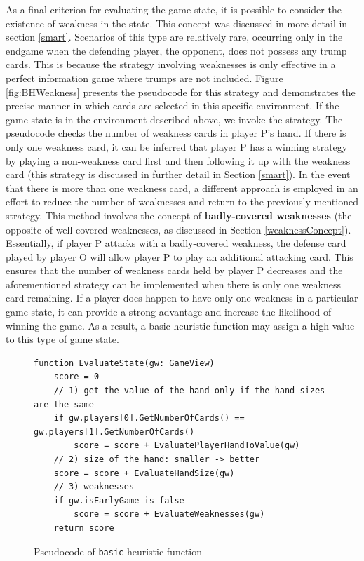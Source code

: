 As a final criterion for evaluating the game state, it is possible to consider the existence of weakness in the state. This concept was discussed in more detail in section \ref{smart}. Scenarios of this type are relatively rare, occurring only in the endgame when the defending player, the opponent, does not possess any trump cards. This is because the strategy involving weaknesses is only effective in a perfect information game where trumps are not included. Figure \ref{fig:BHWeakness} presents the pseudocode for this strategy and demonstrates the precise manner in which cards are selected in this specific environment. If the game state is in the environment described above, we invoke the strategy. The pseudocode checks the number of weakness cards in player P's hand. If there is only one weakness card, it can be inferred that player P has a winning strategy by playing a non-weakness card first and then following it up with the weakness card (this strategy is discussed in further detail in Section \ref{smart}). In the event that there is more than one weakness card, a different approach is employed in an effort to reduce the number of weaknesses and return to the previously mentioned strategy. This method involves the concept of \textbf{badly-covered weaknesses} (the opposite of well-covered weaknesses, as discussed in Section \ref{weaknessConcept}). Essentially, if player P attacks with a badly-covered weakness, the defense card played by player O will allow player P to play an additional attacking card. This ensures that the number of weakness cards held by player P decreases and the aforementioned strategy can be implemented when there is only one weakness card remaining. If a player does happen to have only one weakness in a particular game state, it can provide a strong advantage and increase the likelihood of winning the game. As a result, a basic heuristic function may assign a high value to this type of game state.

\begin{figure}[h]
\captionsetup{justification=centering}
\begin{lstlisting}
function EvaluateState(gw: GameView)
    score = 0
    // 1) get the value of the hand only if the hand sizes are the same
    if gw.players[0].GetNumberOfCards() == gw.players[1].GetNumberOfCards()
        score = score + EvaluatePlayerHandToValue(gw)
    // 2) size of the hand: smaller -> better 
    score = score + EvaluateHandSize(gw)
    // 3) weaknesses 
    if gw.isEarlyGame is false
        score = score + EvaluateWeaknesses(gw)
    return score
\end{lstlisting}
\caption{Pseudocode of \texttt{basic} heuristic function}
\label{fig:basicEval}
\end{figure}

